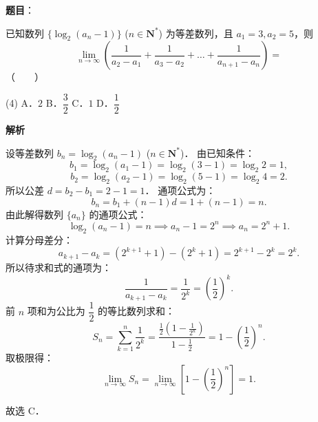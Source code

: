 \begin{answer}

\textbf{题目}：

已知数列 $\{\log_2(a_n - 1)\}$ ($n \in \mathbf{N}^*$) 为等差数列，且 $a_1 = 3, a_2 = 5$，则
\nopagebreak[4]
\[
\lim_{n\to\infty} \left(\frac{1}{a_2 - a_1} + \frac{1}{a_3 - a_2} + \dots + \frac{1}{a_{n+1} - a_n}\right) =
\]
\mbox{（　　）}

\begin{gkopts}(4)
\task A．$2$
\task B．$\dfrac{3}{2}$
\task C．$1$
\task D．$\dfrac{1}{2}$
\end{gkopts}

\textbf{解析}

设等差数列 $b_n = \log_2(a_n - 1)$ ($n \in \mathbf{N}^*$)．
由已知条件：
\nopagebreak[4]
\[
b_1 = \log_2(a_1 - 1) = \log_2(3 - 1) = \log_2 2 = 1,
\]
\nopagebreak[4]
\[
b_2 = \log_2(a_2 - 1) = \log_2(5 - 1) = \log_2 4 = 2.
\]
所以公差 $d = b_2 - b_1 = 2 - 1 = 1$．
通项公式为：
\nopagebreak[4]
\[
b_n = b_1 + (n - 1)d = 1 + (n - 1) = n.
\]
由此解得数列 $\{a_n\}$ 的通项公式：
\nopagebreak[4]
\[
\log_2(a_n - 1) = n \implies a_n - 1 = 2^n \implies a_n = 2^n + 1.
\]
计算分母差分：
\nopagebreak[4]
\[
a_{k+1} - a_k = (2^{k+1} + 1) - (2^k + 1) = 2^{k+1} - 2^k = 2^k.
\]
所以待求和式的通项为：
\nopagebreak[4]
\[
\frac{1}{a_{k+1} - a_k} = \frac{1}{2^k} = \left(\frac{1}{2}\right)^k.
\]
前 $n$ 项和为公比为 $\dfrac{1}{2}$ 的等比数列求和：
\nopagebreak[4]
\[
S_n = \sum_{k=1}^n \frac{1}{2^k} = \frac{\frac{1}{2}\left(1 - \frac{1}{2^n}\right)}{1 - \frac{1}{2}} = 1 - \left(\frac{1}{2}\right)^n.
\]
取极限得：
\nopagebreak[4]
\[
\lim_{n\to\infty} S_n = \lim_{n\to\infty} \left[1 - \left(\frac{1}{2}\right)^n\right] = 1.
\]

故选 C．


\end{answer}
